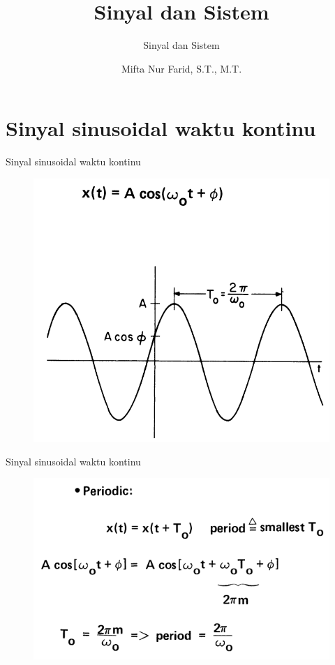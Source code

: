 \documentclass[pdflatex,compress,mathserif]{beamer}
\title{Sinyal dan Sistem}
\subtitle{Sinyal dan Sistem}
\author{Mifta Nur Farid, S.T., M.T.}
\begin{document}
\maketitle

\section{Sinyal sinusoidal waktu kontinu}
\begin{frame}{Sinyal sinusoidal waktu kontinu}
	\begin{figure}
		\centering
		\includegraphics[height=0.8\textheight]{img/01.slide_01}
	\end{figure}
\end{frame}

\begin{frame}{Sinyal sinusoidal waktu kontinu}
	\begin{figure}
		\centering
		\includegraphics[height=0.7\textheight]{img/01.slide_02_01}
	\end{figure}
\end{frame}
\end{document}

